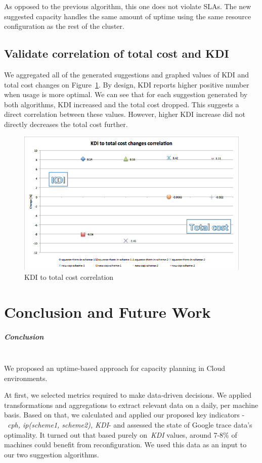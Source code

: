 \documentclass[]{final_report}
\newcommand{\myparagraph}[1]{\paragraph{#1}\mbox{}\\}
\begin{document}
As opposed to the previous algorithm, this one does not violate SLAs. The new suggested capacity handles the same amount of uptime using the same resource configuration as the rest of the cluster. 


\section{Validate correlation of total cost and KDI}

We aggregated all of the generated suggestions and graphed values of KDI and total cost changes on Figure~\ref{fig:kdi_to_cost}. 
By design, KDI reports higher positive number when usage is more optimal. We can see that for each suggestion generated by both algorithms, KDI increased and the total cost dropped. This suggests a direct correlation between these values. However, higher KDI increase did not directly decreases the total cost further.  

\begin{figure}[H]
	\includegraphics[width=\linewidth]{figures/kdi_to_cost}
	\caption{KDI to total cost correlation}
	\label{fig:kdi_to_cost}
\end{figure}


\chapter{Conclusion and Future Work}

\myparagraph{Conclusion}
We proposed an uptime-based approach for capacity planning in Cloud environments. 

At first, we selected metrics required to make data-driven decisions. We applied transformations and aggregations to extract relevant data on a daily, per machine basis. Based on that, we calculated and applied our proposed key indicators -~\textit{cph, ip(scheme1, scheme2), KDI}- and assessed the state of Google trace data's optimality. It turned out that based purely on~\textit{KDI} values, around 7-8\% of machines could benefit from reconfiguration. We used this data as an input to our two suggestion algorithms. 
\end{document}
